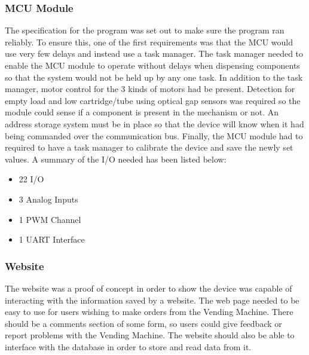 \documentclass[a4paper,11pt]{article}
\numberwithin{figure}{section}
\numberwithin{table}{section}
\begin{document}
\subsubsection{MCU Module}
\label{subsec:mcuspec}
The specification for the program was set out to make sure the program ran reliably. To ensure this, one of the first requirements was that the MCU would use very few delays and instead use a task manager. The task manager needed to enable the MCU module to operate without delays when dispensing components so that the system would not be held up by any one task. In addition to the task manager, motor control for the 3 kinds of motors had be present. Detection for empty load and low cartridge/tube using optical gap sensors was required so the module could sense if a component is present in the mechanism or not. An address storage system must be in place so that the device will know when it had being commanded over the communication bus. Finally, the MCU module had to required to have a task manager to calibrate the device and save the newly set values. A summary of the I/O needed has been listed below:
	
	\begin{itemize}
	\setlength\itemsep{0em}
	\item 22 I/O
	\item 3 Analog Inputs
	\item 1 PWM Channel
	\item 1 UART Interface		
	\end{itemize}
	
\subsubsection{Website}
The website was a proof of concept in order to show the device was capable of interacting with the information saved by a website. The web page needed to be easy to use for users wishing to make orders from the Vending Machine. There should be a comments section of some form, so users could give feedback or report problems with the Vending Machine. The website should also be able to interface with the database in order to store and read data from it.

\newpage
\end{document}
